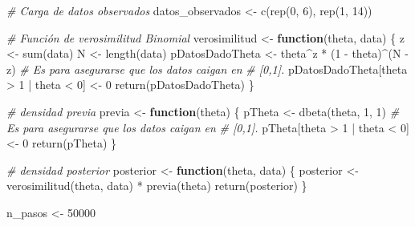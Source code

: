 \documentclass[
  12pt,
]{book}
\newenvironment{Shaded}{\begin{snugshade}}{\end{snugshade}}
\newcommand{\CommentTok}[1]{\textcolor[rgb]{0.56,0.35,0.01}{\textit{#1}}}
\newcommand{\ControlFlowTok}[1]{\textcolor[rgb]{0.13,0.29,0.53}{\textbf{#1}}}
\newcommand{\DecValTok}[1]{\textcolor[rgb]{0.00,0.00,0.81}{#1}}
\newcommand{\FunctionTok}[1]{\textcolor[rgb]{0.00,0.00,0.00}{#1}}
\newcommand{\NormalTok}[1]{#1}
\newcommand{\OtherTok}[1]{\textcolor[rgb]{0.56,0.35,0.01}{#1}}
\newcommand{\SpecialCharTok}[1]{\textcolor[rgb]{0.00,0.00,0.00}{#1}}
\theoremstyle{definition}
\theoremstyle{definition}
\theoremstyle{definition}
\theoremstyle{definition}
\theoremstyle{remark}
\begin{document}
\begin{Shaded}
\begin{Highlighting}[]
\CommentTok{\# Carga de datos observados}
\NormalTok{datos\_observados }\OtherTok{\textless{}{-}} \FunctionTok{c}\NormalTok{(}\FunctionTok{rep}\NormalTok{(}\DecValTok{0}\NormalTok{, }\DecValTok{6}\NormalTok{), }\FunctionTok{rep}\NormalTok{(}\DecValTok{1}\NormalTok{, }\DecValTok{14}\NormalTok{))}

\CommentTok{\# Función de verosimilitud Binomial}
\NormalTok{verosimilitud }\OtherTok{\textless{}{-}} \ControlFlowTok{function}\NormalTok{(theta, data) \{}
\NormalTok{    z }\OtherTok{\textless{}{-}} \FunctionTok{sum}\NormalTok{(data)}
\NormalTok{    N }\OtherTok{\textless{}{-}} \FunctionTok{length}\NormalTok{(data)}
\NormalTok{    pDatosDadoTheta }\OtherTok{\textless{}{-}}\NormalTok{ theta}\SpecialCharTok{\^{}}\NormalTok{z }\SpecialCharTok{*}\NormalTok{ (}\DecValTok{1} \SpecialCharTok{{-}}\NormalTok{ theta)}\SpecialCharTok{\^{}}\NormalTok{(N }\SpecialCharTok{{-}}\NormalTok{ z)}
    \CommentTok{\# Es para asegurarse que los datos caigan en}
    \CommentTok{\# [0,1].}
\NormalTok{    pDatosDadoTheta[theta }\SpecialCharTok{\textgreater{}} \DecValTok{1} \SpecialCharTok{|}\NormalTok{ theta }\SpecialCharTok{\textless{}} \DecValTok{0}\NormalTok{] }\OtherTok{\textless{}{-}} \DecValTok{0}
    \FunctionTok{return}\NormalTok{(pDatosDadoTheta)}
\NormalTok{\}}

\CommentTok{\# densidad previa}
\NormalTok{previa }\OtherTok{\textless{}{-}} \ControlFlowTok{function}\NormalTok{(theta) \{}
\NormalTok{    pTheta }\OtherTok{\textless{}{-}} \FunctionTok{dbeta}\NormalTok{(theta, }\DecValTok{1}\NormalTok{, }\DecValTok{1}\NormalTok{)}
    \CommentTok{\# Es para asegurarse que los datos caigan en}
    \CommentTok{\# [0,1].}
\NormalTok{    pTheta[theta }\SpecialCharTok{\textgreater{}} \DecValTok{1} \SpecialCharTok{|}\NormalTok{ theta }\SpecialCharTok{\textless{}} \DecValTok{0}\NormalTok{] }\OtherTok{\textless{}{-}} \DecValTok{0}
    \FunctionTok{return}\NormalTok{(pTheta)}
\NormalTok{\}}

\CommentTok{\# densidad posterior}
\NormalTok{posterior }\OtherTok{\textless{}{-}} \ControlFlowTok{function}\NormalTok{(theta, data) \{}
\NormalTok{    posterior }\OtherTok{\textless{}{-}} \FunctionTok{verosimilitud}\NormalTok{(theta, data) }\SpecialCharTok{*} \FunctionTok{previa}\NormalTok{(theta)}
    \FunctionTok{return}\NormalTok{(posterior)}
\NormalTok{\}}

\NormalTok{n\_pasos }\OtherTok{\textless{}{-}} \DecValTok{50000}


\end{Highlighting}
\end{Shaded}
\end{document}
